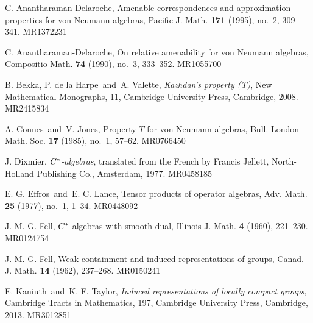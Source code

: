 \documentclass[a4paper,11pt]{article}
\begin{document}
\begin{thebibliography}{99}

 C. Anantharaman-Delaroche, Amenable correspondences and approximation properties for von Neumann algebras, Pacific J. Math. {\bf 171} (1995), no.~2, 309--341. MR1372231

 C. Anantharaman-Delaroche, On relative amenability for von Neumann algebras, Compositio Math. {\bf 74} (1990), no.~3, 333--352. MR1055700

 B. Bekka, P. de la Harpe\ and\ A. Valette, {\it Kazhdan's property (T)}, New Mathematical Monographs, 11, Cambridge University Press, Cambridge, 2008. MR2415834

 A. Connes\ and\ V. Jones, Property $T$ for von Neumann algebras, Bull. London Math. Soc. {\bf 17} (1985), no.~1, 57--62. MR0766450

 J. Dixmier, {\it $C\sp*$-algebras}, translated from the French by Francis Jellett, North-Holland Publishing Co., Amsterdam, 1977. MR0458185

 E. G. Effros\ and\ E. C. Lance, Tensor products of operator algebras, Adv. Math. {\bf 25} (1977), no.~1, 1--34. MR0448092

 J. M. G. Fell, $C\sp{\ast} $-algebras with smooth dual, Illinois J. Math. {\bf 4} (1960), 221--230. MR0124754

 J. M. G. Fell, Weak containment and induced representations of groups, Canad. J. Math. {\bf 14} (1962), 237--268. MR0150241

 E. Kaniuth\ and\ K. F. Taylor, {\it Induced representations of locally compact groups}, Cambridge Tracts in Mathematics, 197, Cambridge University Press, Cambridge, 2013. MR3012851

\end{thebibliography}
\end{document}
